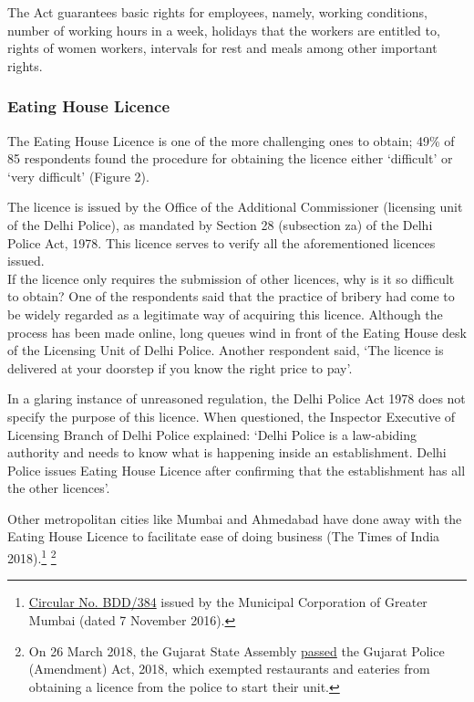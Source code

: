 \documentclass[a4paper, 12pt]{article}
\begin{document}
                   The Act guarantees basic rights for employees, namely, working conditions, number of working hours in a week, holidays that the workers are entitled to, rights of women workers, intervals for rest and meals among other important rights.
         
         
                   \subsubsection{Eating House Licence}
                   The Eating House Licence is one of the more challenging ones to obtain; 49\% of 85 respondents found the procedure for obtaining the licence either ‘difficult’ or ‘very difficult’ (Figure 2).
                   
                   The licence is issued by the Office of the Additional Commissioner (licensing unit of the Delhi Police), as mandated by Section 28 (subsection za) of the Delhi Police Act, 1978. This licence serves to verify all the aforementioned licences issued.\\
                   If the licence only requires the submission of other licences, why is it so difficult to obtain? One of the respondents said that the practice of bribery had come to be widely regarded as a legitimate way of acquiring this licence. Although the process has 
been made online, long queues wind in front of the Eating House desk of the Licensing Unit of Delhi Police. Another respondent said, ‘The licence is delivered at your doorstep if you know the right price to pay’.
                   
                   In a glaring instance of unreasoned regulation, the Delhi Police Act 1978 does not specify the purpose of this licence. When questioned, the Inspector Executive of Licensing Branch of Delhi Police explained: ‘Delhi Police is a law-abiding authority and 
needs to know what is happening inside an establishment. Delhi Police issues Eating House Licence after confirming that the establishment has all the other licences’.
                   
                   Other metropolitan cities like Mumbai and Ahmedabad have done away with the Eating House Licence to facilitate ease of doing business (The Times of India 2018).\footnote{\href{https://bit.ly/2xiMwpL}{Circular No. BDD/384} issued by the Municipal 
Corporation of Greater Mumbai (dated 7 November 2016).} \footnote{On 26 March 2018, the Gujarat State Assembly \href{https://bit.ly/2xktGyu}{passed} the Gujarat Police (Amendment) Act, 2018, which exempted restaurants and eateries from obtaining a licence 
from the police to start their unit.}
                   
\end{document}
